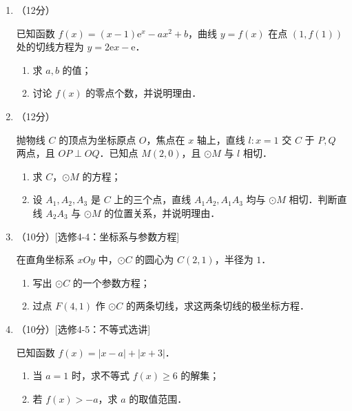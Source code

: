 \begin{description}
\begin{enumerate}[leftmargin=5pt]
        \item （12分）

        已知函数 $f(x)=(x-1)\mathrm{e}^x-ax^2+b$，曲线 $y=f(x)$ 在点 $(1,f(1))$ 处的切线方程为 $y=2\mathrm{e} x-\mathrm{e}$．

        \begin{enumerate}[label=(\arabic*)]
            \item 求 $a,b$ 的值；
            \item 讨论 $f(x)$ 的零点个数，并说明理由．
        \end{enumerate}

        \item （12分）

        抛物线 $C$ 的顶点为坐标原点 $O$，焦点在 $x$ 轴上，直线 $l:x=1$ 交 $C$ 于 $P,Q$ 两点，且 $OP\perp OQ$．已知点 $M(2,0)$，且 $\odot M$ 与 $l$ 相切．

        \begin{enumerate}[label=(\arabic*)]
            \item 求 $C$，$\odot M$ 的方程；
            \item 设 $A_1,A_2,A_3$ 是 $C$ 上的三个点，直线 $A_1A_2,A_1A_3$ 均与 $\odot M$ 相切．判断直线 $A_2A_3$ 与 $\odot M$ 的位置关系，并说明理由．
        \end{enumerate}

        \item （10分）[选修4-4：坐标系与参数方程]

        在直角坐标系 $xOy$ 中，$\odot C$ 的圆心为 $C(2,1)$，半径为 $1$．

        \begin{enumerate}[label=(\arabic*)]
            \item 写出 $\odot C$ 的一个参数方程；
            \item 过点 $F(4,1)$ 作 $\odot C$ 的两条切线，求这两条切线的极坐标方程．
        \end{enumerate}

        \item （10分）[选修4-5：不等式选讲]

        已知函数 $f(x)=|x-a|+|x+3|$．

        \begin{enumerate}[label=(\arabic*)]
            \item 当 $a=1$ 时，求不等式 $f(x)\geqslant6$ 的解集；
            \item 若 $f(x)>-a$，求 $a$ 的取值范围．
        \end{enumerate}
    \end{enumerate}
\end{description}
\clearpage


